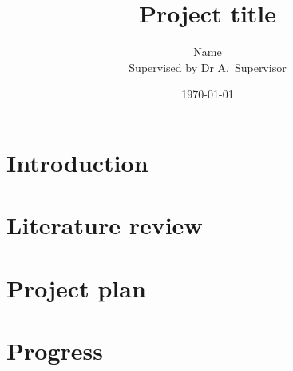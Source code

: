 \documentclass[11pt]{article}
\title{Project title}
\author{Name \\ Supervised by Dr A.\ Supervisor}
\date{\today}
\begin{document}
\maketitle

\section{Introduction}

\section{Literature review}

\section{Project plan}

\section{Progress}




\end{document}

